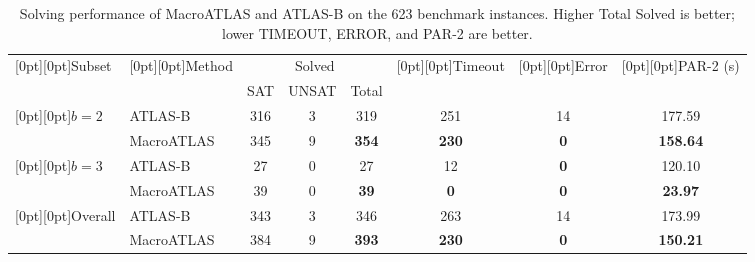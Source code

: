 \begin{table}[!htbp]
\caption{Solving performance of MacroATLAS and ATLAS-B on the 623 benchmark instances. Higher Total Solved is better; lower TIMEOUT, ERROR, and PAR-2 are better.}
\label{tab:performance}
\centering
\small
\setlength{\tabcolsep}{4pt}
\begin{tabular}{@{}llcccccc@{}}
\toprule
\raisebox{-1.6ex}[0pt][0pt]{Subset} & \raisebox{-1.6ex}[0pt][0pt]{Method} & \multicolumn{3}{c}{Solved} & \raisebox{-1.6ex}[0pt][0pt]{Timeout} & \raisebox{-1.6ex}[0pt][0pt]{Error} & \raisebox{-1.6ex}[0pt][0pt]{PAR-2 (s)} \\
\cmidrule(lr){3-5}
& & SAT & UNSAT & Total & & & \\
\midrule
\raisebox{-1.2ex}[0pt][0pt]{$b=2$} & ATLAS-B & 316 & 3 & 319 & 251 & 14 & 177.59 \\
& MacroATLAS & 345 & 9 & \textbf{354} & \textbf{230} & \textbf{0} & \textbf{158.64} \\
\midrule
\raisebox{-1.2ex}[0pt][0pt]{$b=3$} & ATLAS-B & 27 & 0 & 27 & 12 & \textbf{0} & 120.10 \\
& MacroATLAS & 39 & 0 & \textbf{39} & \textbf{0} & \textbf{0} & \textbf{23.97} \\
\midrule
\raisebox{-1.2ex}[0pt][0pt]{Overall} & ATLAS-B & 343 & 3 & 346 & 263 & 14 & 173.99 \\
& MacroATLAS & 384 & 9 & \textbf{393} & \textbf{230} & \textbf{0} & \textbf{150.21} \\
\bottomrule
\end{tabular}
\end{table}
